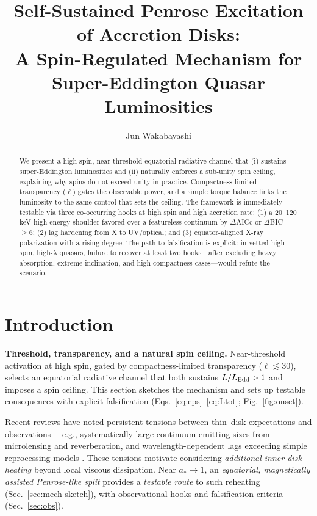 \documentclass[twocolumn]{aastex701}
\begin{document}
\title{Self-Sustained Penrose Excitation of Accretion Disks:\\
A Spin-Regulated Mechanism for Super-Eddington Quasar Luminosities}

\author[0009-0008-1891-4579]{Jun Wakabayashi}

\begin{abstract}
We present a high-spin, near-threshold equatorial radiative channel that (i) sustains super-Eddington luminosities and (ii) naturally enforces a sub-unity spin ceiling, explaining why spins do not exceed unity in practice. Compactness-limited transparency ($\ell$) gates the observable power, and a simple torque balance links the luminosity to the same control that sets the ceiling. The framework is immediately testable via three co-occurring hooks at high spin and high accretion rate: (1) a 20--120 keV high-energy shoulder favored over a featureless continuum by $\Delta$AICc or $\Delta$BIC $\ge 6$; (2) lag hardening from X to UV/optical; and (3) equator-aligned X-ray polarization with a rising degree. The path to falsification is explicit: in vetted high-spin, high-$\lambda$ quasars, failure to recover at least two hooks---after excluding heavy absorption, extreme inclination, and high-compactness cases---would refute the scenario.
\end{abstract}



\section{Introduction}\label{sec:intro}
\noindent\textbf{Threshold, transparency, and a natural spin ceiling.}
Near-threshold activation at high spin, gated by compactness-limited transparency ($\ell\!\lesssim\!30$), selects an equatorial radiative channel that both sustains $L/L_{\rm Edd}>1$ and imposes a spin ceiling.
This section sketches the mechanism and sets up testable consequences with explicit falsification (Eqs.~\eqref{eq:eps}--\eqref{eq:Ltot}; Fig.~\ref{fig:onset}).

Recent reviews have noted persistent tensions between thin–disk expectations and observations—
e.g., systematically large continuum-emitting sizes from microlensing and reverberation, and
wavelength-dependent lags exceeding simple reprocessing models \citep[e.g.,][]{Cackett2021RevMap,Sun2020AGNsize}.
These tensions motivate considering \emph{additional inner-disk heating} beyond local viscous dissipation.
Near $a_*\!\to\!1$, an \emph{equatorial, magnetically assisted Penrose-like split} provides a \emph{testable route}
to such reheating (Sec.~\ref{sec:mech-sketch}), with observational hooks and falsification criteria
(Sec.~\ref{sec:obs}).
\end{document}
